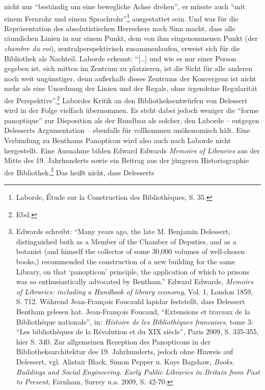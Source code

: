 nicht nur \enquote{beständig um eine bewegliche Achse drehen}, er müsste
auch \enquote{mit einem Fernrohr und einem Sprachrohr}\footnote{Laborde,
  Étude sur la Construction des Bibliothèques, S. 35.} ausgestattet
sein. Und was für die Repräsentation des absolutistischen Herrschers
noch Sinn macht, dass alle räumlichen Linien in nur einem Punkt, dem von
ihm eingenommenen Punkt (der \emph{chambre du roi}),
zentralperspektivisch zusammenlaufen, erweist sich für die Bibliothek
als Nachteil. Laborde erkennt: \enquote{{[}\ldots{}{]} und wie es nur
einer Person gegeben ist, sich mitten im Zentrum zu platzieren, ist die
Sicht für alle anderen noch weit ungünstiger, denn außerhalb dieses
Zentrums der Konvergenz ist nicht mehr als eine Unordnung der Linien und
der Regale, ohne irgendeine Regularität der Perspektive}.\footnote{Ebd.}
Labordes Kritik an den Bibliotheksentwürfen von Delessert wird in der
Folge vielfach übernommen. Es steht dabei jedoch weniger die
\enquote{forme panoptique} zur Disposition als der Rundbau als solcher,
den Laborde -- entgegen Delesserts Argumentation -- ebenfalls für
vollkommen unökonomisch hält. Eine Verbindung zu Benthams Panopticon
wird also auch nach Laborde nicht hergestellt. Eine Ausnahme bilden
Edward Edwards \emph{Memoirs of Libraries} aus der Mitte des 19.
Jahrhunderts sowie ein Beitrag aus der jüngeren Historiographie der
Bibliothek.\footnote{Edwards schreibt: \enquote{Many years ago, the late
  M. Benjamin Delessert, distinguished both as a Member of the Chamber
  of Deputies, and as a botanist (and himself the collector of some
  30,000 volumes of well-chosen books,) recommended the construction of
  a new building for the same Library, on that \enquote{panopticon}
  principle, the application of which to prisons was so enthusiastically
  advocated by Bentham.} Edward Edwards\emph{, Memoirs of Libraries:
  including a Handbook of library economy}, Vol. 1, London 1859, S. 712.
  Während Jean-François Foucauld lapidar feststellt, dass Delessert
  Bentham gelesen hat. Jean-François Foucaud, \enquote{Extensions et
  travaux de la Bibliothèque nationale}, in\emph{: Histoire de les
  Bibliothèques francaises}, tome 3: \enquote{Les bibliothèques de la
  Révolution et du XIX siècle}, Paris 2009, S. 335-355, hier S. 340. Zur
  allgemeinen Rezeption des Panopticons in der Bibliotheksarchitektur
  des 19. Jahrhunderts, jedoch ohne Hinweis auf Delessert, vgl. Alistair
  Black, Simon Pepper u. Kaye Bagshaw, \emph{Books, Buildings and Social
  Engineering. Early Public Libraries in Britain from Past to Present},
  Farnham, Surrey u.a. 2009, S. 42-70.} Das heißt nicht, dass Delesserts

